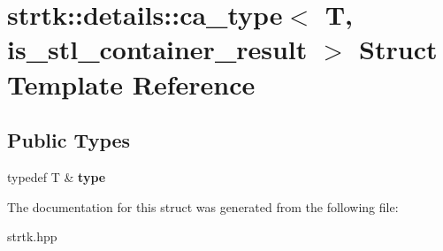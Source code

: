 \hypertarget{structstrtk_1_1details_1_1ca__type}{\section{strtk\-:\-:details\-:\-:ca\-\_\-type$<$ T, is\-\_\-stl\-\_\-container\-\_\-result $>$ Struct Template Reference}
\label{structstrtk_1_1details_1_1ca__type}
}
\subsection*{Public Types}
\begin{DoxyCompactItemize}
\item 
\hypertarget{structstrtk_1_1details_1_1ca__type_af12f10f2cf8f32103c9ed8ca8e4d00e7}{typedef T \& {\bfseries type}}\label{structstrtk_1_1details_1_1ca__type_af12f10f2cf8f32103c9ed8ca8e4d00e7}

\end{DoxyCompactItemize}


The documentation for this struct was generated from the following file\-:\begin{DoxyCompactItemize}
\item 
strtk.\-hpp\end{DoxyCompactItemize}
